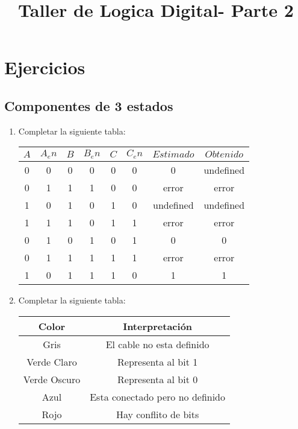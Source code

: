 \documentclass{article}
\title{Taller de Logica Digital- Parte 2}
\begin{document}
\maketitle

\section{Ejercicios}

\subsection{\textbf{Componentes de 3 estados}}
\begin{enumerate}
    \item Completar la siguiente tabla:
    \begin{center}
        \begin{tabular}{c c c c c c|c|c}
            $A$ & $A_en$ & $B$ & $B_en$ & $C$ &$C_en$ & $Estimado$ & $Obtenido$ \\\hline
            0 & 0 & 0 & 0 & 0 & 0 & 0 & undefined \\
            0 & 1 & 1 & 1 & 0 & 0 & error & error \\
            1 & 0 & 1 & 0 & 1 & 0 & undefined & undefined \\
            1 & 1 & 1 & 0 & 1 & 1 & error & error \\
            0 & 1 & 0 & 1 & 0 & 1 & 0 & 0 \\
            0 & 1 & 1 & 1 & 1 & 1 & error & error \\
            1 & 0 & 1 & 1 & 1 & 0 & 1 & 1 \\
        \end{tabular}
    \end{center}
    \item Completar la siguiente tabla:
    \begin{center}{
        \renewcommand{\arraystretch}{1.5}
        \begin{tabular}{c | c}
            Color & Interpretación \\ \hline
            Gris & El cable no esta definido\\ 
            Verde Claro & Representa al bit 1 \\
            Verde Oscuro & Representa al bit 0\\
            Azul & Esta conectado pero no definido\\
            Rojo & Hay conflito de bits\\
        \end{tabular}}

\end{center}
\end{enumerate}
\end{document}
